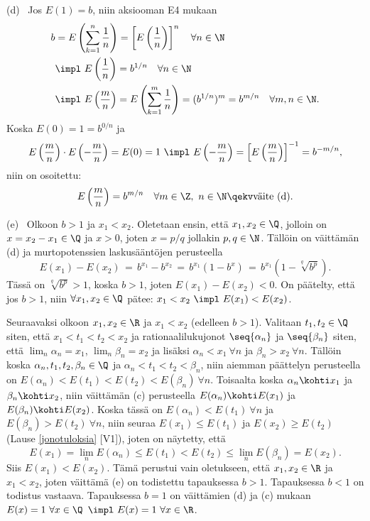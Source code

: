 (d) \ Jos $E(1)=b$, niin aksiooman E4 mukaan
\begin{align*}
b&=E\left(\sum_{k=1}^n \frac{1}{n}\right)
                          = \left[E\left(\frac{1}{n}\right)\right]^n \quad \forall n\in\N \\
 &\impl \ E\left(\frac{1}{n}\right) = b^{1/n}\quad \forall n\in\N \\
 &\impl \ E\left(\frac{m}{n}\right)
            = E\left(\sum_{k=1}^m \frac{1}{n}\right) 
            = (b^{1/n})^m = b^{m/n}\quad \forall m,n\in\N.
\end{align*}
Koska $E(0)=1=b^{0/n}$ ja
\[
E\left(\frac{m}{n}\right)\cdot E\left(-\frac{m}{n}\right)=E(0)=1 \ 
   \impl \ E\left(-\frac{m}{n}\right) = \left[E\left(\frac{m}{n}\right)\right]^{-1} = b^{-m/n},
\]
niin on osoitettu:
\[
E\left(\frac{m}{n}\right) = b^{m/n} \quad \forall m\in\Z,\ n\in\N \qekv \text{väite (d)}.
\]

(e) \ Olkoon $b>1$ ja $x_1<x_2$. Oletetaan ensin, että $x_1,x_2\in\Q$, jolloin on
$x=x_2-x_1\in\Q$ ja $x>0$, joten $x=p/q$ jollakin $p,q\in\N$. Tällöin on väittämän (d) ja
murtopotenssien laskusääntöjen perusteella
\[
E(x_1)-E(x_2) \,=\, b^{x_1}-b^{x_2}  \,=\, b^{x_1}\left(1-b^x\right) 
                                    \,=\, b^{x_1}\left(1-\sqrt[q]{b^p}\right).
\]
Tässä on $\sqrt[q]{b^p}>1$, koska $b>1$, joten $E(x_1)-E(x_2)<0$. On päätelty, että jos
$b>1$, niin $\forall x_1,x_2\in\Q$ pätee: $x_1<x_2\ \impl\ E(x_1)<E(x_2)$.

Seuraavaksi olkoon $x_1,x_2\in\R$ ja $x_1<x_2$ (edelleen $b>1$). Valitaan $t_1,t_2\in\Q$
siten, että $x_1<t_1<t_2<x_2$ ja rationaalilukujonot $\seq{\alpha_n}$ ja $\seq{\beta_n}$
siten, että $\lim_n\alpha_n=x_1$, $\lim_n\beta_n=x_2$ ja lisäksi $\alpha_n<x_1\ \forall n$ ja
$\beta_n>x_2\ \forall n$. Tällöin koska $\alpha_n,t_1,t_2,\beta_n\in\Q$ ja
$\alpha_n<t_1<t_2<\beta_n$, niin aiemman päättelyn perusteella on
$E(\alpha_n)<E(t_1)<E(t_2)<E(\beta_n)\ \forall n$. Toisaalta koska $\alpha_n \kohti x_1$ ja
$\beta_n \kohti x_2$, niin väittämän (c) perusteella $E(\alpha_n) \kohti E(x_1)$ ja
$E(\beta_n) \kohti E(x_2)$. Koska tässä on $E(\alpha_n)<E(t_1)\ \forall n$ ja
$E(\beta_n)>E(t_2)\ \forall n$, niin seuraa $E(x_1) \le E(t_1)$ ja $E(x_2) \ge E(t_2)$
(Lause \ref{jonotuloksia} [V1]), joten on näytetty, että
\[
E(x_1) = \lim_n E(\alpha_n) \le E(t_1) < E(t_2) \le \lim_n E(\beta_n) = E(x_2).
\]
Siis $E(x_1)<E(x_2)$. Tämä perustui vain oletukseen, että $x_1,x_2\in\R$ ja $x_1<x_2$, joten
väittämä (e) on todistettu tapauksessa $b>1$. Tapauksessa $b<1$ on todistus vastaava.
Tapauksessa $b=1$ on väittämien (d) ja (c) mukaan $E(x)=1\ \forall x\in\Q$
$\impl\ E(x)=1\ \forall x\in\R$. \loppu

